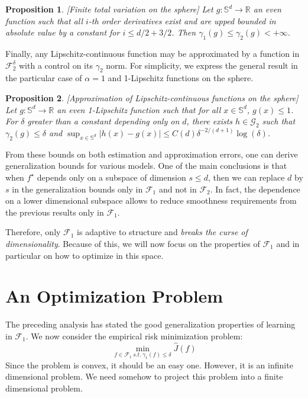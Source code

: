 \documentclass[a4paper, 11pt]{scrartcl}
\newtheorem{proposition}{Proposition}[section]
\begin{document}
\begin{proposition}
\emph{[Finite total variation on the sphere]} Let $g : \mathbb{S}^d \rightarrow \mathbb{R}$ an even function such that all $i$-th order derivatives exist and are upped bounded in absolute value by a constant for $i \leq d/2 + 3/2$. Then $\gamma_1(g) \leq \gamma_2(g) < +\infty$.
\end{proposition}

Finally, any Lipschitz-continuous function may be approximated by a function in $\mathcal{F}_2^\delta$ with a control on its $\gamma_2$ norm. For simplicity, we express the general result in the particular case of $\alpha = 1$ and 1-Lipschitz functions on the sphere.

\begin{proposition}
\emph{[Approximation of Lipschitz-continuous functions on the sphere]} Let $g : \mathbb{S}^d \rightarrow \mathbb{R}$ an even 1-Lipschitz function such that for all $x \in  \mathbb{S}^d$, $g(x) \leq 1$. For $\delta$ greater than a constant depending only on $d$, there exists $h\in \mathcal{G}_2$ such that $\gamma_2(g) \leq \delta$ and $\sup_{x \in  \mathbb{S}^d} |h(x) - g(x)| \leq C(d) \delta^{-2/(d+1)} \log(\delta)$.
\end{proposition}

From these bounds on both estimation and approximation errors, one can derive generalization bounds for various models. One of the main conclusions is that when $f^\star$ depends only on a subspace of dimension $s \leq d$, then we can replace $d$ by $s$ in the generalization bounds only in $\mathcal{F}_1$ and not in $\mathcal{F}_2$. In fact, the dependence on a lower dimensional subspace allows to reduce smoothness requirements from the previous results only in $\mathcal{F}_1$.

 Therefore, only $\mathcal{F}_1$ is adaptive to structure and \textit{breaks the curse of dimensionality}. Because of this, we will now focus on the properties of $\mathcal{F}_1$ and in particular on how to optimize in this space.

\section{An Optimization Problem}

The preceding analysis has stated the good generalization properties of learning in $\mathcal{F}_1$. We now consider the empirical risk minimization problem:
\begin{equation}
\min_{f\in \mathcal{F}_1~ s.t. ~ \gamma_{1} (f) \leq \delta}  \hat J(f)
\end{equation}
 Since the problem is convex, it should be an easy one. However, it is an infinite dimensional problem. We need somehow to project this problem into a finite dimensional problem.
 
\end{document}

